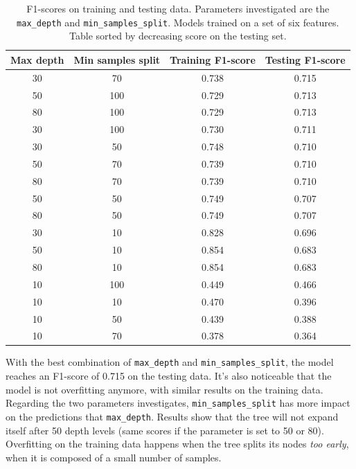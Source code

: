 \begin{table}[htbp]
    \centering
    \begin{tabular}{c|c|c|c}
    \textbf{Max depth} & \textbf{Min samples split} & \textbf{Training F1-score} & \textbf{Testing F1-score} \\ \hline
    30	&  70   &  	0.738  &  0.715 \\
    50	&  100  &  	0.729  &  0.713 \\
    80	&  100  &  	0.729  &  0.713 \\
    30	&  100  &  	0.730  &  0.711 \\
    30	&  50   &  	0.748  &  0.710 \\
    50	&  70   &  	0.739  &  0.710 \\
    80	&  70   &  	0.739  &  0.710 \\
    50	&  50   &  	0.749  &  0.707 \\
    80	&  50   &  	0.749  &  0.707 \\
    30	&  10   &  	0.828  &  0.696 \\
    50	&  10   &  	0.854  &  0.683 \\
    80	&  10   &  	0.854  &  0.683 \\
    10	&  100  &  	0.449  &  0.466 \\
    10	&  10   &  	0.470  &  0.396 \\
    10	&  50   &  	0.439  &  0.388 \\
    10	&  70   &  	0.378  &  0.364 
    \end{tabular}
    \caption{F1-scores on training and testing data. Parameters investigated are the \texttt{max\_depth} and \texttt{min\_samples\_split}. Models trained on a set of six features. Table sorted by decreasing score on the testing set.}
    \label{tab:tree-fine-tune}
\end{table}

With the best combination of \texttt{max\_depth} and \texttt{min\_samples\_split}, the model reaches an F1-score of 0.715 on the testing data. It's also noticeable that the model is not overfitting anymore, with similar results on the training data. Regarding the two parameters investigates, \texttt{min\_samples\_split} has more impact on the predictions that \texttt{max\_depth}. Results show that the tree will not expand itself after 50 depth levels (same scores if the parameter is set to 50 or 80). Overfitting on the training data happens when the tree splits its nodes \textit{too early}, when it is composed of a small number of samples.


